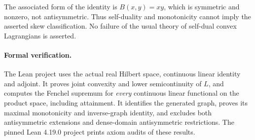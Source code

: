 \documentclass[11pt]{article}
\begin{document}
The associated form of the identity is $B(x,y)=xy$, which is symmetric and nonzero, not antisymmetric. Thus self-duality and monotonicity cannot imply the asserted skew classification. No failure of the usual theory of self-dual convex Lagrangians is asserted.

\paragraph{Formal verification.}
The Lean project uses the actual real Hilbert space, continuous linear identity and adjoint. It proves joint convexity and lower semicontinuity of $L$, and computes the Fenchel supremum for \emph{every} continuous linear functional on the product space, including attainment. It identifies the generated graph, proves its maximal monotonicity and inverse-graph identity, and excludes both antisymmetric extensions and dense-domain antisymmetric restrictions. The pinned Lean 4.19.0 project prints axiom audits of these results.
\end{document}
